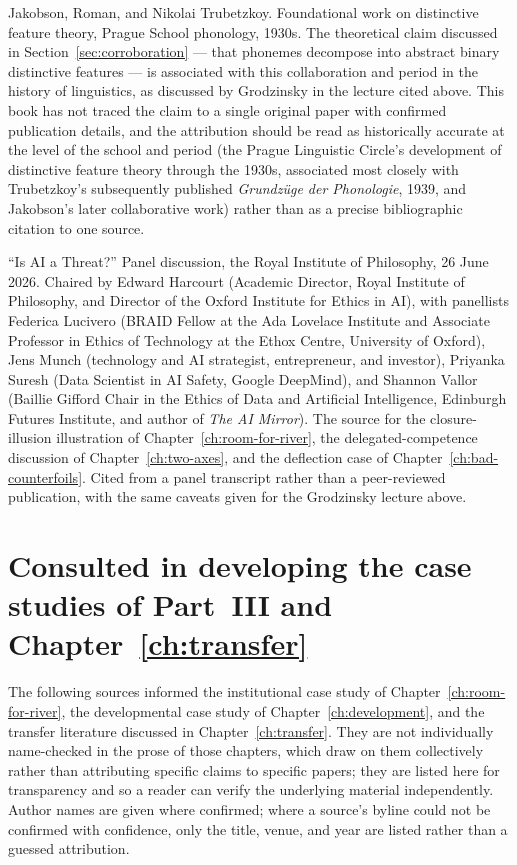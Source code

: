 Jakobson, Roman, and Nikolai Trubetzkoy. Foundational work on distinctive feature theory, Prague School phonology, 1930s. The theoretical claim discussed in Section~\ref{sec:corroboration} --- that phonemes decompose into abstract binary distinctive features --- is associated with this collaboration and period in the history of linguistics, as discussed by Grodzinsky in the lecture cited above. This book has not traced the claim to a single original paper with confirmed publication details, and the attribution should be read as historically accurate at the level of the school and period (the Prague Linguistic Circle's development of distinctive feature theory through the 1930s, associated most closely with Trubetzkoy's subsequently published \emph{Grundz\"uge der Phonologie}, 1939, and Jakobson's later collaborative work) rather than as a precise bibliographic citation to one source.

``Is AI a Threat?'' Panel discussion, the Royal Institute of Philosophy, 26 June 2026. Chaired by Edward Harcourt (Academic Director, Royal Institute of Philosophy, and Director of the Oxford Institute for Ethics in AI), with panellists Federica Lucivero (BRAID Fellow at the Ada Lovelace Institute and Associate Professor in Ethics of Technology at the Ethox Centre, University of Oxford), Jens Munch (technology and AI strategist, entrepreneur, and investor), Priyanka Suresh (Data Scientist in AI Safety, Google DeepMind), and Shannon Vallor (Baillie Gifford Chair in the Ethics of Data and Artificial Intelligence, Edinburgh Futures Institute, and author of \emph{The AI Mirror}). The source for the closure-illusion illustration of Chapter~\ref{ch:room-for-river}, the delegated-competence discussion of Chapter~\ref{ch:two-axes}, and the deflection case of Chapter~\ref{ch:bad-counterfoils}. Cited from a panel transcript rather than a peer-reviewed publication, with the same caveats given for the Grodzinsky lecture above.

\section*{Consulted in developing the case studies of Part~III and Chapter~\ref{ch:transfer}}

The following sources informed the institutional case study of Chapter~\ref{ch:room-for-river}, the developmental case study of Chapter~\ref{ch:development}, and the transfer literature discussed in Chapter~\ref{ch:transfer}. They are not individually name-checked in the prose of those chapters, which draw on them collectively rather than attributing specific claims to specific papers; they are listed here for transparency and so a reader can verify the underlying material independently. Author names are given where confirmed; where a source's byline could not be confirmed with confidence, only the title, venue, and year are listed rather than a guessed attribution.

